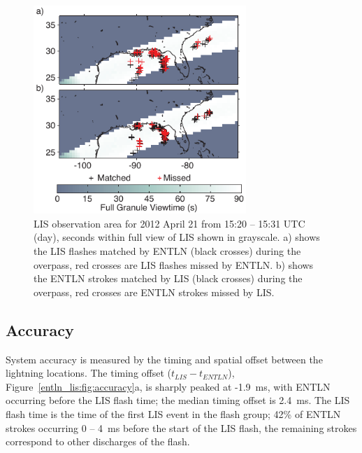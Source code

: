 \begin{figure}[t]
   \centering
   \noindent\includegraphics[width=19pc,angle=0]{entln_lis/Figures/overpass.pdf}
   \caption{LIS observation area for 2012 April 21 from 15:20 -- 15:31 UTC (day), seconds within full view of LIS shown in grayscale.
      		a) shows the LIS flashes matched by ENTLN (black crosses) during the overpass, red crosses are LIS flashes missed by ENTLN.
		b) shows the ENTLN strokes matched by LIS (black crosses) during the overpass, red crosses are ENTLN strokes missed by LIS.
		}
   \label{entln_lis:fig:overpass}
\end{figure}

\subsection{Accuracy}

System accuracy is measured by the timing and spatial offset between the lightning locations.
The timing offset ($t_{LIS} - t_{ENTLN}$), Figure~\ref{entln_lis:fig:accuracy}a, is sharply peaked at -1.9~ms, with ENTLN occurring before the LIS flash time; the median timing offset is 2.4~ms.
The LIS flash time is the time of the first LIS event in the flash group; 42\% of ENTLN strokes occurring 0 -- 4~ms before the start of the LIS flash, the remaining strokes correspond to other discharges of the flash.


